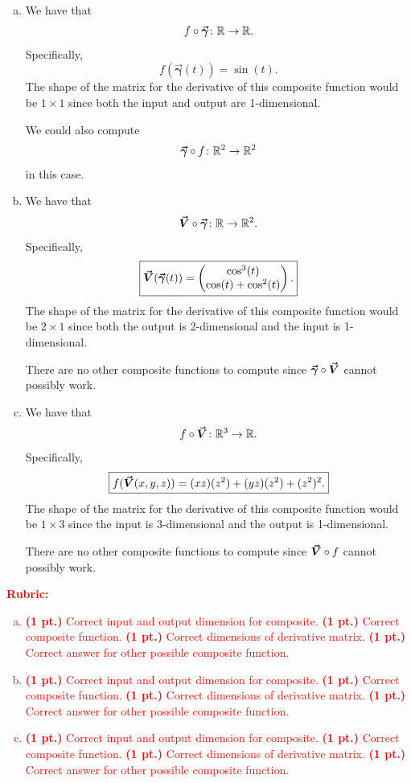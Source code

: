 \documentclass[12pt]{article} %
\newcommand{\curvegamma}{\boldsymbol{\vec{\gamma}}}
\begin{document}
\begin{solution}~
\begin{enumerate}[(a)]
	\item We have that
	\[
	f\circ \curvegamma \colon \R \to \R.
	\]
	Specifically,
	\[
	\boxed{f(\curvegamma(t)) = \sin(t).}
	\]
	The shape of the matrix for the derivative of this composite function would be $1\times 1$ since both the input and output are 1-dimensional.

	We could also compute
	\[
	\curvegamma \circ f \colon \R^2 \to \R^2
	\]
	in this case.

	\item We have that
	\[
	\vecfieldV \circ \curvegamma \colon \R \to \R^2.
	\]
	Specifically,
	\[
	\boxed{\vecfieldV(\curvegamma(t)) = \begin{pmatrix} \cos^3(t) \\ \cos(t) + \cos^2(t) \end{pmatrix}.}
	\]
	The shape of the matrix for the derivative of this composite function would be $2\times 1$ since both the output is 2-dimensional and the input is 1-dimensional. 

	There are no other composite functions to compute since $\curvegamma \circ \vecfieldV$ cannot possibly work.

	\item We have that
	\[
	f\circ \boldsymbol{\vec{V}} \colon \mathbb{R}^3 \to \mathbb{R}.
	\]
	Specifically,
	\[
	\boxed{f(\boldsymbol{\vec{V}}(x,y,z)) = (xz)(z^2)+(yz)(z^2)+(z^2)^2.}
	\]
	The shape of the matrix for the derivative of this composite function would be $1\times 3$ since the input is 3-dimensional and the output is 1-dimensional.

	There are no other composite functions to compute since $\boldsymbol{\vec{V}} \circ f$ cannot possibly work.
\end{enumerate}
\end{solution}
\vspace*{1cm}
\textcolor{red}{
\noindent \textbf{Rubric:}
\begin{enumerate}[(a)]
    \item \textbf{(1 pt.)} Correct input and output dimension for composite. \textbf{(1 pt.)} Correct composite function. \textbf{(1 pt.)} Correct dimensions of derivative matrix. \textbf{(1 pt.)} Correct answer for other possible composite function.
	\item \textbf{(1 pt.)} Correct input and output dimension for composite. \textbf{(1 pt.)} Correct composite function. \textbf{(1 pt.)} Correct dimensions of derivative matrix. \textbf{(1 pt.)} Correct answer for other possible composite function.
	\item \textbf{(1 pt.)} Correct input and output dimension for composite. \textbf{(1 pt.)} Correct composite function. \textbf{(1 pt.)} Correct dimensions of derivative matrix. \textbf{(1 pt.)} Correct answer for other possible composite function.
\end{enumerate}
}
\newpage
\end{document}

